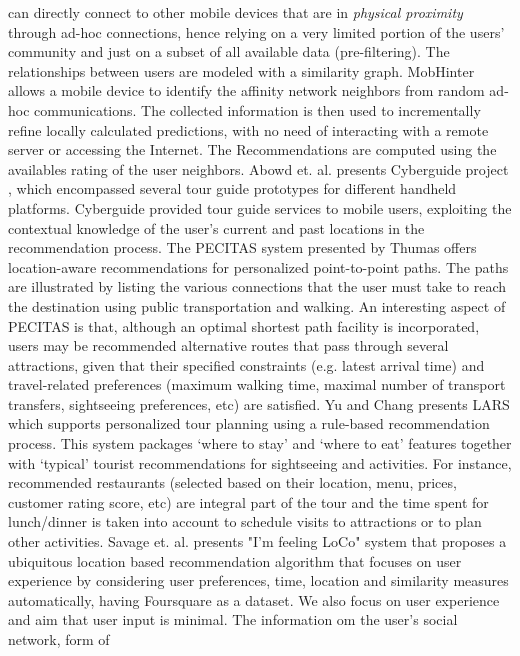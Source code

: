 can directly connect to other mobile devices that are in \textit{physical
proximity} through ad-hoc connections, hence relying on a very limited
portion of the users’ community and just on a subset of all available
data (pre-filtering). The relationships between users are modeled with
a similarity graph. MobHinter allows a mobile device to identify the
affinity network neighbors from random ad-hoc communications. The
collected information is then used to incrementally refine locally
calculated predictions, with no need of interacting with a remote
server or accessing the Internet. The Recommendations are computed
using the availables rating of the user neighbors.
Abowd et. al. presents Cyberguide project \cite{abowd1997cyberguide},
which encompassed several tour guide prototypes for different handheld
platforms. Cyberguide provided tour guide services to mobile users,
exploiting the contextual knowledge of the user’s current and past
locations in the recommendation process. The PECITAS system
\cite{tumas2009personalized} presented by Thumas offers location-aware
recommendations for personalized point-to-point paths. The paths are
illustrated by listing the various connections that the user must take
to reach the destination using public transportation and walking. An
interesting aspect of PECITAS is that, although an optimal shortest 
path facility is incorporated, users may be recommended alternative 
routes that pass through several attractions, given that
their specified constraints (e.g. latest arrival time) and travel-related 
preferences (maximum walking time, maximal number of transport
transfers, sightseeing preferences, etc) are satisfied. Yu and Chang
presents LARS \cite{yu2009personalized} which supports personalized
tour planning using a rule-based recommendation process. This system
packages ‘where to stay’ and ‘where to eat’ features together with
‘typical’ tourist recommendations for sightseeing and activities. For
instance, recommended restaurants (selected based on their location,
menu, prices, customer rating score, etc) are integral part of the
tour and the time spent for lunch/dinner is taken into account to
schedule visits to attractions or to plan other activities.
Savage et. al. presents  "I'm feeling LoCo" system \cite{savage2012m}
that proposes a ubiquitous location­ based recommendation algorithm
that focuses on user experience by considering user preferences, time,
location and similarity measures automatically, having Foursquare as a
dataset. We also focus on user experience and aim that user input is
minimal. The information  om the user's social network, form of
